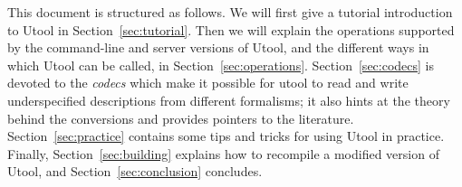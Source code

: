 This document is structured as follows. We will first give a tutorial
introduction to Utool in Section~\ref{sec:tutorial}. Then we will
explain the operations supported by the command-line and server versions of Utool, and the different ways in
which Utool can be called, in
Section~\ref{sec:operations}. Section~\ref{sec:codecs} is devoted to
the \emph{codecs} which make it possible for utool to read and write
underspecified descriptions from different formalisms; it also hints
at the theory behind the conversions and provides pointers to the
literature. Section~\ref{sec:practice} contains some tips and tricks
for using Utool in practice. Finally, Section~\ref{sec:building}
explains how to recompile a modified version of Utool, and
Section~\ref{sec:conclusion} concludes.

